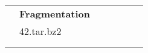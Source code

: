\documentclass{article}           %
\begin{document}
\begin{table}[]
\begin{tabular}{lllccccc}
\multicolumn{1}{|l|}{}                               & \multicolumn{2}{c|}{\textbf{Fragmentation}}                             & \multicolumn{1}{c|}{}       & \multicolumn{1}{c|}{}       & \multicolumn{1}{c|}{}           & \multicolumn{1}{c|}{}      & \multicolumn{1}{c|}{}        \\ \cline{2-8} 
\multicolumn{1}{|l|}{}                               & \multicolumn{2}{l|}{42.tar.bz2}                                         & \multicolumn{1}{c|}{}       & \multicolumn{1}{c|}{}       & \multicolumn{1}{c|}{}           & \multicolumn{1}{c|}{}      & \multicolumn{1}{c|}{}        \\ \hline
                                                     &                                           &                             & \multicolumn{1}{l}{}        & \multicolumn{1}{l}{}        & \multicolumn{1}{l}{}            & \multicolumn{1}{l}{}       & \multicolumn{1}{l}{}         \\
                                                     &                                           &                             & \multicolumn{1}{l}{}        & \multicolumn{1}{l}{}        & \multicolumn{1}{l}{}            & \multicolumn{1}{l}{}       & \multicolumn{1}{l}{}        
\end{tabular}
\end{table}
\end{document}
